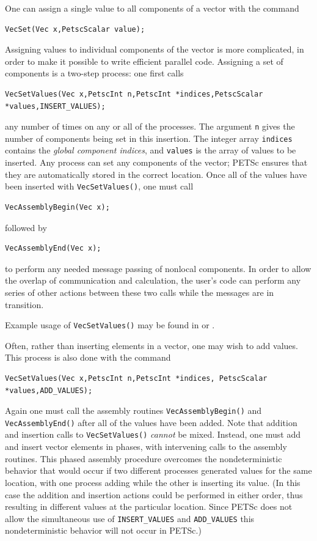 One can assign a single value to all components of a vector with the
command
\begin{lstlisting}
VecSet(Vec x,PetscScalar value);
\end{lstlisting}
Assigning values to individual components of the vector is more
complicated, in order to make it possible to write efficient parallel
code.  Assigning a set of components is a two-step process: one
first calls
\begin{lstlisting}
VecSetValues(Vec x,PetscInt n,PetscInt *indices,PetscScalar *values,INSERT_VALUES);
\end{lstlisting}
any number of times on any or all of the processes. The argument
\lstinline{n} gives the number of components being set in this
insertion. The integer array \lstinline{indices} contains the {\em global component
indices}, and \lstinline{values} is the array of values to be inserted.
Any process can set any components of the vector; PETSc ensures that
they are automatically stored in the correct location.
Once all of the values have been inserted with \lstinline{VecSetValues()},
one must call 
\begin{lstlisting}
VecAssemblyBegin(Vec x);
\end{lstlisting}
followed by
\begin{lstlisting}
VecAssemblyEnd(Vec x);
\end{lstlisting}
to perform any needed message passing of nonlocal components.
In order to allow the overlap of communication and calculation,
the user's code can perform any series of other actions between these
two calls while the messages are in transition.

Example usage of \lstinline{VecSetValues()} may be found in
 or .

Often, rather than inserting elements in a vector, one may wish to
add values. This process 
is also done with the command
\begin{lstlisting}
VecSetValues(Vec x,PetscInt n,PetscInt *indices, PetscScalar *values,ADD_VALUES);
\end{lstlisting}
Again one must call the assembly routines
\lstinline{VecAssemblyBegin()} and \lstinline{VecAssemblyEnd()} after all of the values
have been added.  Note that addition and insertion calls to
\lstinline{VecSetValues()} {\em cannot} be mixed.  Instead, one must add and insert
vector elements in phases, with intervening calls to the assembly
routines. This phased assembly procedure overcomes the nondeterministic
behavior that
would occur if two different processes generated values
for the same location, with one process adding while the other is inserting
its value.  (In this case the addition and insertion actions could be performed
in either order,
thus resulting in different values at the particular location. Since
PETSc does not allow the simultaneous use of \lstinline{INSERT_VALUES} and
\lstinline{ADD_VALUES} this nondeterministic behavior will not occur in PETSc.)


